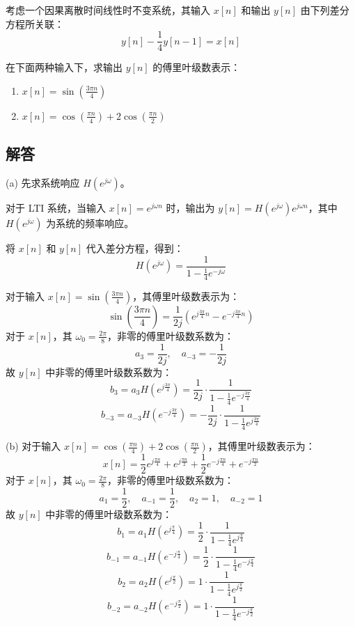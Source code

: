 \documentclass[UTF8]{report}
\theoremstyle{MyLineTheoremStyle} %
\theoremstyle{MyBlockTheoremStyle} %
\theoremstyle{MySubsubsectionStyle} %
\begin{document}
考虑一个因果离散时间线性时不变系统，其输入 $x[n]$ 和输出 $y[n]$ 由下列差分方程所关联：
\[
y[n] - \frac{1}{4}y[n-1] = x[n]
\]

在下面两种输入下，求输出 $y[n]$ 的傅里叶级数表示：

\begin{enumerate}
    \item $x[n] = \sin\left(\frac{3\pi n}{4}\right)$
    
    \item $x[n] = \cos\left(\frac{\pi n}{4}\right) + 2\cos\left(\frac{\pi n}{2}\right)$
\end{enumerate}

\subsection*{解答}
(a) 先求系统响应 $H(e^{j\omega})$。

对于 LTI 系统，当输入 $x[n] = e^{j\omega n}$ 时，输出为 $y[n] = H(e^{j\omega})e^{j\omega n}$，其中 $H(e^{j\omega})$ 为系统的频率响应。

将 $x[n]$ 和 $y[n]$ 代入差分方程，得到：
\[
H(e^{j\omega}) = \frac{1}{1-\frac{1}{4}e^{-j\omega}}
\]

对于输入 $x[n] = \sin\left(\frac{3\pi n}{4}\right)$，其傅里叶级数表示为：
\[
\sin\left(\frac{3\pi n}{4}\right) = \frac{1}{2j}\left(e^{j\frac{3\pi}{4}n} - e^{-j\frac{3\pi}{4}n}\right)
\]
对于 $x[n]$，其 $\omega_0 = \frac{2\pi}{8}$，非零的傅里叶级数系数为：
\[
a_3 = \frac{1}{2j}, \quad a_{-3} = -\frac{1}{2j}
\]
故 $y[n]$ 中非零的傅里叶级数系数为：
\[
b_3 = a_3 H(e^{j\frac{3\pi}{4}}) = \frac{1}{2j} \cdot \frac{1}{1-\frac{1}{4}e^{-j\frac{3\pi}{4}}}
\]
\[
b_{-3} = a_{-3} H(e^{-j\frac{3\pi}{4}}) = -\frac{1}{2j} \cdot \frac{1}{1-\frac{1}{4}e^{j\frac{3\pi}{4}}}
\]

(b) 对于输入 $x[n] = \cos\left(\frac{\pi n}{4}\right) + 2\cos\left(\frac{\pi n}{2}\right)$，其傅里叶级数表示为：
\[
x[n] = \frac{1}{2}e^{j\frac{\pi n}{4}} + e^{j\frac{\pi n}{2}} + \frac{1}{2}e^{-j\frac{\pi n}{4}} + e^{-j\frac{\pi n}{2}}
\]
对于 $x[n]$，其 $\omega_0 = \frac{2\pi}{8}$，非零的傅里叶级数系数为：
\[
a_1 = \frac{1}{2}, \quad a_{-1} = \frac{1}{2}, \quad a_2 = 1, \quad a_{-2} = 1
\]
故 $y[n]$ 中非零的傅里叶级数系数为：
\[
b_1 = a_1 H(e^{j\frac{\pi}{4}}) = \frac{1}{2} \cdot \frac{1}{1-\frac{1}{4}e^{j\frac{\pi}{4}}}
\]
\[
b_{-1} = a_{-1} H(e^{-j\frac{\pi}{4}}) = \frac{1}{2} \cdot \frac{1}{1-\frac{1}{4}e^{-j\frac{\pi}{4}}}
\]
\[
b_2 = a_2 H(e^{j\frac{\pi}{2}}) = 1 \cdot \frac{1}{1-\frac{1}{4}e^{j\frac{\pi}{2}}}
\]
\[
b_{-2} = a_{-2} H(e^{-j\frac{\pi}{2}}) = 1 \cdot \frac{1}{1-\frac{1}{4}e^{-j\frac{\pi}{2}}}
\]
\end{document}
